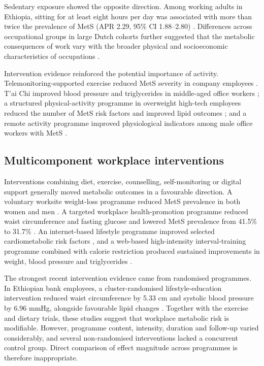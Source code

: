 \documentclass[11pt]{article}
\begin{document}
Sedentary exposure showed the opposite direction. Among working adults in Ethiopia, sitting for at least eight hours per day was associated with more than twice the prevalence of MetS (APR 2.29, 95\% CI 1.88--2.80) \citep{Motuma2020}. Differences across occupational groups in large Dutch cohorts further suggested that the metabolic consequences of work vary with the broader physical and socioeconomic characteristics of occupations \citep{vanZon2020Occupational,Runge2021Metabolic}.

Intervention evidence reinforced the potential importance of activity. Telemonitoring-supported exercise reduced MetS severity in company employees \citep{Haufe2019}. T'ai Chi improved blood pressure and triglycerides in middle-aged office workers \citep{Choi2017}; a structured physical-activity programme in overweight high-tech employees reduced the number of MetS risk factors and improved lipid outcomes \citep{Fang2019}; and a remote activity programme improved physiological indicators among male office workers with MetS \citep{ParkHwang2024}.

\subsection{Multicomponent workplace interventions}

Interventions combining diet, exercise, counselling, self-monitoring or digital support generally moved metabolic outcomes in a favourable direction. A voluntary worksite weight-loss programme reduced MetS prevalence in both women and men \citep{Earnest2015}. A targeted workplace health-promotion programme reduced waist circumference and fasting glucose and lowered MetS prevalence from 41.5\% to 31.7\% \citep{Ryu2017}. An internet-based lifestyle programme improved selected cardiometabolic risk factors \citep{Kim2015Internet}, and a web-based high-intensity interval-training programme combined with calorie restriction produced sustained improvements in weight, blood pressure and triglycerides \citep{So2025}.

The strongest recent intervention evidence came from randomised programmes. In Ethiopian bank employees, a cluster-randomised lifestyle-education intervention reduced waist circumference by 5.33 cm and systolic blood pressure by 6.96 mmHg, alongside favourable lipid changes \citep{Bogale2025}. Together with the exercise and dietary trials, these studies suggest that workplace metabolic risk is modifiable. However, programme content, intensity, duration and follow-up varied considerably, and several non-randomised interventions lacked a concurrent control group. Direct comparison of effect magnitude across programmes is therefore inappropriate.
\end{document}
